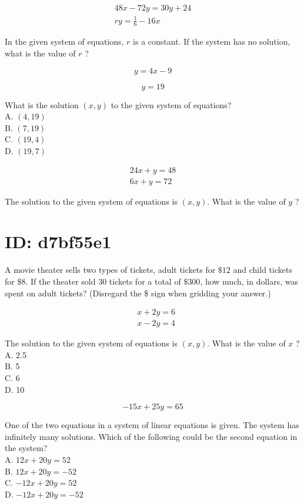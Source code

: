 $$
\begin{gathered}
48 x-72 y=30 y+24 \\
r y=\frac{1}{6}-16 x
\end{gathered}
$$

In the given system of equations, $r$ is a constant. If the system has no solution, what is the value of $r$ ?

$$
y=4 x-9
$$

$$
y=19
$$

What is the solution $(x, y)$ to the given system of equations?\\
A. $(4,19)$\\
B. $(7,19)$\\
C. $(19,4)$\\
D. $(19,7)$

$$
\begin{gathered}
24 x+y=48 \\
6 x+y=72
\end{gathered}
$$

The solution to the given system of equations is $(x, y)$. What is the value of $y$ ?

\section*{ID: d7bf55e1}
A movie theater sells two types of tickets, adult tickets for $\$ 12$ and child tickets for $\$ 8$. If the theater sold 30 tickets for a total of $\$ 300$, how much, in dollars, was spent on adult tickets? (Disregard the \$ sign when gridding your answer.)

$$
\begin{aligned}
& x+2 y=6 \\
& x-2 y=4
\end{aligned}
$$

The solution to the given system of equations is $(x, y)$. What is the value of $x$ ?\\
A. 2.5\\
B. 5\\
C. 6\\
D. 10

$$
-15 x+25 y=65
$$

One of the two equations in a system of linear equations is given. The system has infinitely many solutions. Which of the following could be the second equation in the system?\\
A. $12 x+20 y=52$\\
B. $12 x+20 y=-52$\\
C. $-12 x+20 y=52$\\
D. $-12 x+20 y=-52$

